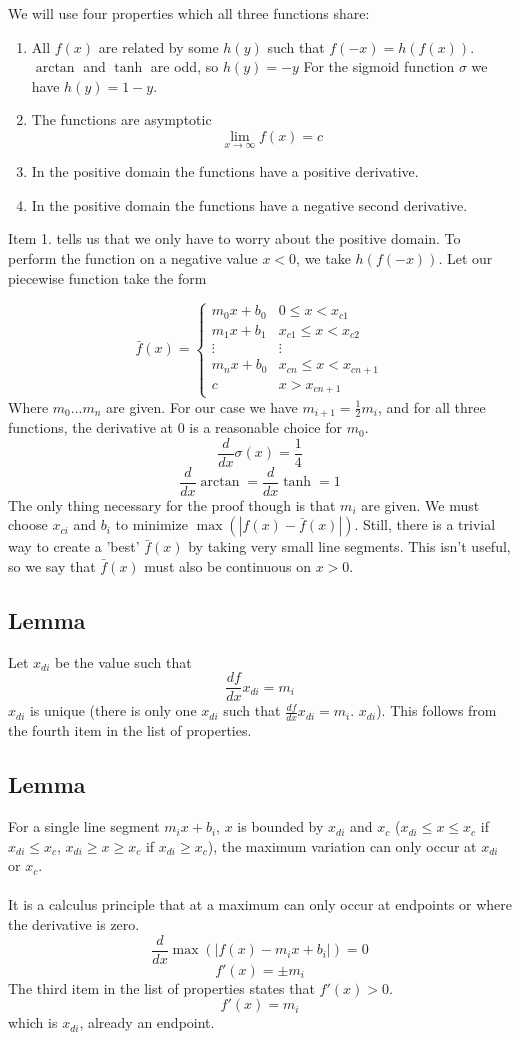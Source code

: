 \documentclass[a4paper,10pt,preprint,3p,hidelinks]{elsarticle}
\begin{document}
	We will use four properties which all three functions share:
	\begin{enumerate}
		\item All $f(x)$ are related by some $h(y)$ such that $f(-x) = h(f(x))$.\\
		$\arctan$ and $\tanh$ are odd, so $h(y)=-y$ For the sigmoid function $\sigma$ we have $h(y) = 1 - y$. 
		\item The functions are asymptotic \[\lim_{x \to \infty} f(x)=c\]
		\item In the positive domain the functions have a positive derivative.
		\item In the positive domain the functions have a negative second derivative.
	\end{enumerate}
	Item 1. tells us that we only have to worry about the positive domain. To perform the function on a negative value $x < 0$, we take $h(f(-x))$. 
	Let our piecewise function take the form
	
	\[ \bar f(x) = 
		\begin{cases} 
		m_0x+b_0 & 0\leq x < x_{c1} \\
		m_1x+b_1 & x_{c1}\leq x < x_{c2} \\
		\vdots & \vdots \\
		m_nx+b_0 & x_{cn}\leq x < x_{cn+1} \\
		c & x > x_{cn+1}
		\end{cases}
	\]
	Where $m_0...m_n$ are given. For our case we have $m_{i+1}=\frac 1 2 m_i$, and for all three functions, the derivative at 0 is a reasonable choice for $m_0$. 
	\[\frac d {dx} \sigma(x) = \frac 1 4\]
	\[\frac d {dx} \arctan = \frac d {dx} \tanh = 1\]
	 The only thing necessary for the proof though is that $m_i$ are given. We must choose $x_{ci}$ and $b_i$ to minimize $\max(|f(x) - \bar{f}(x)|)$. Still, there is a trivial way to create a 'best' $\bar{f}(x)$ by taking very small line segments. This isn't useful, so we say that $\bar{f}(x)$ must also be continuous on $x > 0$.
	\subsection{Lemma}
	Let $x_{di}$ be the value such that
	\[\frac {df} {dx} x_{di} = m_i\]
	$x_{di}$ is unique (there is only one $x_{di}$ such that $\frac {df} {dx} x_{di} = m_i$. $x_{di}$). This follows from the fourth item in the list of properties.
	
	\subsection{Lemma}
	For a single line segment $m_ix+b_i$, $x$ is bounded by $x_{di}$ and $x_c$ ($x_{di} \leq x \leq x_c$ if $x_{di} \leq x_c$, $x_{di} \geq x \geq x_c$ if $x_{di} \geq x_c$), the maximum variation can only occur at $x_{di}$ or $x_c$.\\ \\
	It is a calculus principle that at a maximum can only occur at endpoints or where the derivative is zero.
	\[\frac d {dx}\max(|f(x) - m_ix+b_i|) = 0\]
	\[f'(x) = \pm m_i\]
	The third item in the list of properties states that $f'(x) > 0$.
	\[f'(x) = m_i\]
	which is $x_{di}$, already an endpoint.
	
\end{document}

